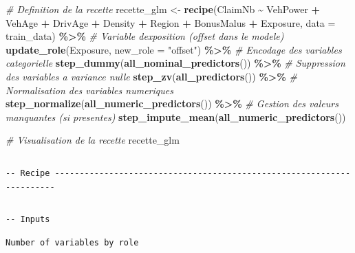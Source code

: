 \documentclass[
  french,
]{book}
\newenvironment{Shaded}{\begin{snugshade}}{\end{snugshade}}
\newcommand{\AttributeTok}[1]{\textcolor[rgb]{0.13,0.29,0.53}{#1}}
\newcommand{\CommentTok}[1]{\textcolor[rgb]{0.56,0.35,0.01}{\textit{#1}}}
\newcommand{\FunctionTok}[1]{\textcolor[rgb]{0.13,0.29,0.53}{\textbf{#1}}}
\newcommand{\NormalTok}[1]{#1}
\newcommand{\OtherTok}[1]{\textcolor[rgb]{0.56,0.35,0.01}{#1}}
\newcommand{\SpecialCharTok}[1]{\textcolor[rgb]{0.81,0.36,0.00}{\textbf{#1}}}
\newcommand{\StringTok}[1]{\textcolor[rgb]{0.31,0.60,0.02}{#1}}
\theoremstyle{definition}
\theoremstyle{definition}
\theoremstyle{definition}
\theoremstyle{definition}
\theoremstyle{remark}
\begin{document}
\begin{Shaded}
\begin{Highlighting}[]
\CommentTok{\# Definition de la recette}
\NormalTok{recette\_glm }\OtherTok{\textless{}{-}} \FunctionTok{recipe}\NormalTok{(ClaimNb }\SpecialCharTok{\textasciitilde{}}\NormalTok{ VehPower }\SpecialCharTok{+}\NormalTok{ VehAge }\SpecialCharTok{+}\NormalTok{ DrivAge }\SpecialCharTok{+} 
\NormalTok{                    Density }\SpecialCharTok{+}\NormalTok{ Region }\SpecialCharTok{+}\NormalTok{ BonusMalus }\SpecialCharTok{+}\NormalTok{ Exposure,}
                    \AttributeTok{data =}\NormalTok{ train\_data) }\SpecialCharTok{\%\textgreater{}\%}
  \CommentTok{\# Variable d\textquotesingle{}exposition (offset dans le modele)}
  \FunctionTok{update\_role}\NormalTok{(Exposure, }\AttributeTok{new\_role =} \StringTok{"offset"}\NormalTok{) }\SpecialCharTok{\%\textgreater{}\%}
  \CommentTok{\# Encodage des variables categorielle}
  \FunctionTok{step\_dummy}\NormalTok{(}\FunctionTok{all\_nominal\_predictors}\NormalTok{()) }\SpecialCharTok{\%\textgreater{}\%}
  \CommentTok{\# Suppression des variables a variance nulle}
  \FunctionTok{step\_zv}\NormalTok{(}\FunctionTok{all\_predictors}\NormalTok{()) }\SpecialCharTok{\%\textgreater{}\%}
  \CommentTok{\# Normalisation des variables numeriques}
  \FunctionTok{step\_normalize}\NormalTok{(}\FunctionTok{all\_numeric\_predictors}\NormalTok{()) }\SpecialCharTok{\%\textgreater{}\%}
  \CommentTok{\# Gestion des valeurs manquantes (si presentes)}
  \FunctionTok{step\_impute\_mean}\NormalTok{(}\FunctionTok{all\_numeric\_predictors}\NormalTok{())}

\CommentTok{\# Visualisation de la recette}
\NormalTok{recette\_glm}
\end{Highlighting}
\end{Shaded}

\begin{verbatim}
\end{verbatim}

\begin{verbatim}
-- Recipe ----------------------------------------------------------------------
\end{verbatim}

\begin{verbatim}
\end{verbatim}

\begin{verbatim}
-- Inputs 
\end{verbatim}

\begin{verbatim}
Number of variables by role
\end{verbatim}
\end{document}
